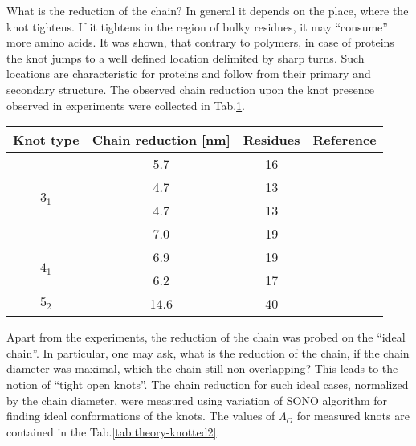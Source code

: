 What is the reduction of the chain?
In general it depends on the place, where the knot tightens.
If it tightens in the region of bulky residues, it may ``consume'' more amino acids.
It was shown, that contrary to polymers, in case of proteins the knot jumps to a well defined location delimited by sharp turns\cite{sulkowska2008tightening}.
Such locations are characteristic for proteins and follow from their primary and secondary structure.
The observed chain reduction upon the knot presence observed in experiments were collected in Tab.\ref{tab:theory-knotted}.

\begin{table}
    \begin{tabular}{c|c|c|c}
        \textbf{Knot type} & \textbf{Chain reduction [nm]} & \textbf{Residues} & \textbf{Reference}\\\hline
        \multirow{4}{*}{$3_1$} & 5.7 & 16 &\cite{ziegler2016knotting}\\
                               & 4.7 & 13 &\cite{dzubiella2009sequence}\\
                               & 4.7 & 13 &\cite{he2014mechanically}\\
                               & 7.0 & 19 &\cite{rivera2020mechanical}\\\hline
        \multirow{2}{*}{$4_1$} & 6.9 & 19 &\cite{dzubiella2009sequence}\\
                               & 6.2 & 17 &\cite{bornschlogl2009tightening}\\\hline
        $5_2$ & 14.6 & 40 &\cite{ziegler2016knotting}\\\hline
    \end{tabular}
    \label{tab:theory-knotted}
\end{table}

Apart from the experiments, the reduction of the chain was probed on the ``ideal chain''.
In particular, one may ask, what is the reduction of the chain, if the chain diameter was maximal, which the chain still non-overlapping?
This leads to the notion of ``tight open knots''\cite{pieranski2001tight}.
The chain reduction for such ideal cases, normalized by the chain diameter, were measured using variation of SONO algorithm for finding ideal conformations of the knots.
The values of $\Lambda_O$ for measured knots are contained in the Tab.\ref{tab:theory-knotted2}.

